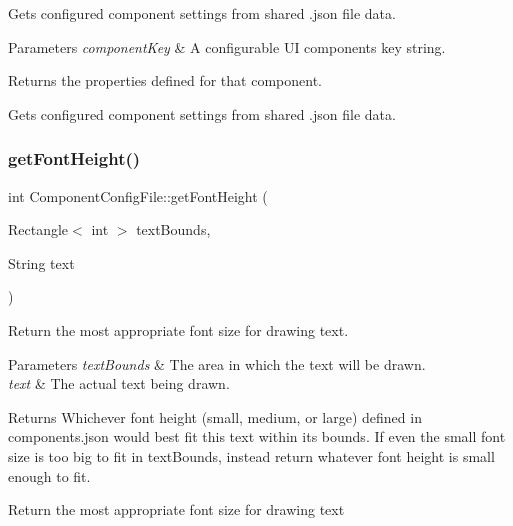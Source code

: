 Gets configured component settings from shared .json file data.


\begin{DoxyParams}{Parameters}
{\em component\+Key} & A configurable UI component\textquotesingle{}s key string.\\
\hline
\end{DoxyParams}
\begin{DoxyReturn}{Returns}
the properties defined for that component.
\end{DoxyReturn}
Gets configured component settings from shared .json file data. \mbox{\label{classComponentConfigFile_a21564a3d43977aac7ed217836fe79f73}} 
\subsubsection{\texorpdfstring{get\+Font\+Height()}{getFontHeight()}}
{\footnotesize\ttfamily int Component\+Config\+File\+::get\+Font\+Height (\begin{DoxyParamCaption}\item[{Rectangle$<$ int $>$}]{text\+Bounds,  }\item[{String}]{text }\end{DoxyParamCaption})}

Return the most appropriate font size for drawing text.


\begin{DoxyParams}{Parameters}
{\em text\+Bounds} & The area in which the text will be drawn.\\
\hline
{\em text} & The actual text being drawn.\\
\hline
\end{DoxyParams}
\begin{DoxyReturn}{Returns}
Whichever font height (small, medium, or large) defined in components.\+json would best fit this text within its bounds. If even the small font size is too big to fit in text\+Bounds, instead return whatever font height is small enough to fit.
\end{DoxyReturn}
Return the most appropriate font size for drawing text \mbox{\label{classComponentConfigFile_a2afa7e95d450f22c91cde28e909fb0b1}} 
